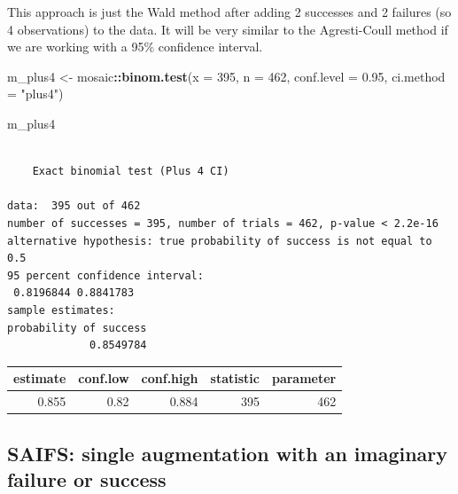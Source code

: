 \documentclass[
]{book}
\newenvironment{Shaded}{\begin{snugshade}}{\end{snugshade}}
\newcommand{\DataTypeTok}[1]{\textcolor[rgb]{0.13,0.29,0.53}{#1}}
\newcommand{\DecValTok}[1]{\textcolor[rgb]{0.00,0.00,0.81}{#1}}
\newcommand{\FloatTok}[1]{\textcolor[rgb]{0.00,0.00,0.81}{#1}}
\newcommand{\KeywordTok}[1]{\textcolor[rgb]{0.13,0.29,0.53}{\textbf{#1}}}
\newcommand{\NormalTok}[1]{#1}
\newcommand{\OperatorTok}[1]{\textcolor[rgb]{0.81,0.36,0.00}{\textbf{#1}}}
\newcommand{\StringTok}[1]{\textcolor[rgb]{0.31,0.60,0.02}{#1}}
\begin{document}
This approach is just the Wald method after adding 2 successes and 2 failures (so 4 observations) to the data. It will be very similar to the Agresti-Coull method if we are working with a 95\% confidence interval.

\begin{Shaded}
\begin{Highlighting}[]
\NormalTok{m_plus4 <-}\StringTok{ }\NormalTok{mosaic}\OperatorTok{::}\KeywordTok{binom.test}\NormalTok{(}\DataTypeTok{x =} \DecValTok{395}\NormalTok{, }\DataTypeTok{n =} \DecValTok{462}\NormalTok{,}
                              \DataTypeTok{conf.level =} \FloatTok{0.95}\NormalTok{,}
                              \DataTypeTok{ci.method =} \StringTok{"plus4"}\NormalTok{)}

\NormalTok{m_plus4}
\end{Highlighting}
\end{Shaded}

\begin{verbatim}

	Exact binomial test (Plus 4 CI)

data:  395 out of 462
number of successes = 395, number of trials = 462, p-value < 2.2e-16
alternative hypothesis: true probability of success is not equal to 0.5
95 percent confidence interval:
 0.8196844 0.8841783
sample estimates:
probability of success 
             0.8549784 
\end{verbatim}

\begin{Shaded}
\end{Shaded}

\begin{tabular}{r|r|r|r|r}
\hline
estimate & conf.low & conf.high & statistic & parameter\\
\hline
0.855 & 0.82 & 0.884 & 395 & 462\\
\hline
\end{tabular}

\hypertarget{saifs-single-augmentation-with-an-imaginary-failure-or-success}{%
\subsection{SAIFS: single augmentation with an imaginary failure or success}\label{saifs-single-augmentation-with-an-imaginary-failure-or-success}}
\end{document}
